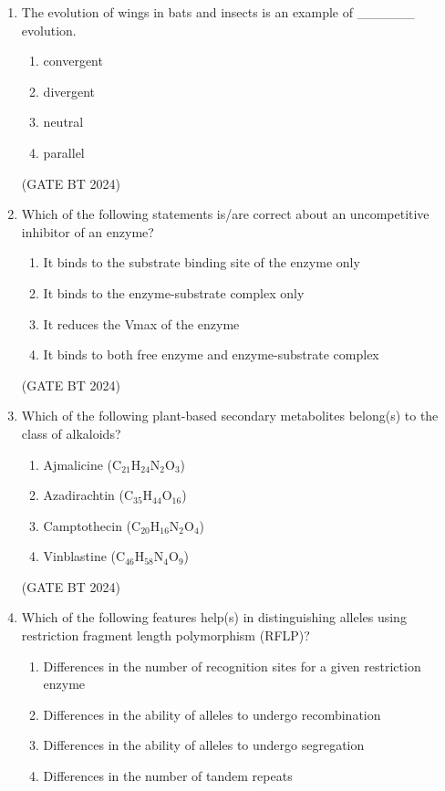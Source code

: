 \documentclass[journal,12pt,onecolumn]{IEEEtran}
\theoremstyle{remark}
\begin{document}
\begin{enumerate}
\item The evolution of wings in bats and insects is an example of \_\_\_\_\_\_ evolution.

\begin{enumerate}
\item convergent \hfill
\item divergent \hfill
\item neutral \hfill
\item parallel
\end{enumerate}

\hfill (GATE BT 2024)

\item Which of the following statements is/are correct about an uncompetitive inhibitor of an enzyme?

\begin{enumerate}
\item It binds to the substrate binding site of the enzyme only \hfill
\item It binds to the enzyme-substrate complex only \hfill
\item It reduces the Vmax of the enzyme \hfill
\item It binds to both free enzyme and enzyme-substrate complex
\end{enumerate}

\hfill (GATE BT 2024)

\item Which of the following plant-based secondary metabolites belong(s) to the class of alkaloids?

\begin{enumerate}
\item Ajmalicine (C$_{21}$H$_{24}$N$_2$O$_3$) \hfill
\item Azadirachtin (C$_{35}$H$_{44}$O$_{16}$) \hfill
\item Camptothecin (C$_{20}$H$_{16}$N$_2$O$_4$) \hfill
\item Vinblastine (C$_{46}$H$_{58}$N$_4$O$_9$)
\end{enumerate}

\hfill (GATE BT 2024)

\item Which of the following features help(s) in distinguishing alleles using restriction fragment length polymorphism (RFLP)?

\begin{enumerate}
\item Differences in the number of recognition sites for a given restriction enzyme \hfill
\item Differences in the ability of alleles to undergo recombination \hfill
\item Differences in the ability of alleles to undergo segregation \hfill
\item Differences in the number of tandem repeats
\end{enumerate}


\end{enumerate}
\end{document}
